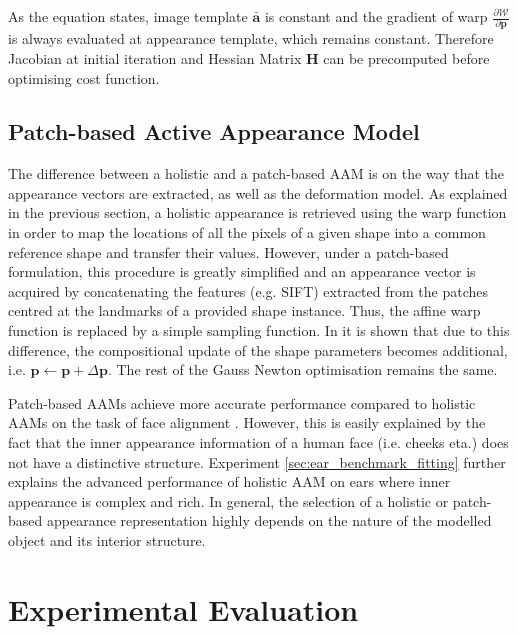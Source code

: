 As the equation states, image template $\bm{\bar{a}}$ is constant and the gradient of warp $\frac{\partial \mathcal{W}}{\partial \bm{p}}$ is always evaluated at appearance template, which remains constant. Therefore Jacobian at initial iteration and Hessian Matrix $\bm{H}$ can be precomputed before optimising cost function.


\subsection{Patch-based Active Appearance Model} 
The difference between a holistic and a patch-based AAM \cite{Tzimiropoulos2014} is on the way that the appearance vectors are extracted, as well as the deformation model. As explained in the previous section, a holistic appearance is retrieved using the warp function in order to map the locations of all the pixels of a given shape into a common reference shape and transfer their values. However, under a patch-based formulation, this procedure is greatly simplified and an appearance vector is acquired by concatenating the features (e.g. SIFT) extracted from the patches centred at the landmarks of a provided shape instance. Thus, the affine warp function is replaced by a simple sampling function. In \cite{Tzimiropoulos2014} it is shown that due to this difference, the compositional update of the shape parameters becomes additional, i.e. $\mathbf{p}\leftarrow\mathbf{p} + \Delta\mathbf{p}$. The rest of the Gauss Newton optimisation remains the same.

Patch-based AAMs achieve more accurate performance compared to holistic AAMs on the task of face alignment \cite{Tzimiropoulos2014}. However, this is easily explained by the fact that the inner appearance information of a human face (i.e. cheeks eta.) does not have a distinctive structure. Experiment \ref{sec:ear_benchmark_fitting} further explains the advanced performance of holistic AAM on ears where inner appearance is complex and rich. In general, the selection of a holistic or patch-based appearance representation highly depends on the nature of the modelled object and its interior structure. 






\section{Experimental Evaluation}

